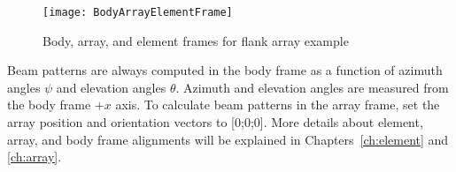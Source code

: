 \begin{figure}[!ht]
\begin{center}
\texttt{[image: BodyArrayElementFrame]}
\caption{\label{fig:ReferenceFrames}Body, array, and element frames for flank array example}
\end{center}
\end{figure}

Beam patterns are always computed in the body frame as a function of azimuth angles $\psi$ and elevation angles $\theta$. Azimuth and elevation angles are measured from the body frame $+x$ axis. To calculate beam patterns in the array frame, set the array position and orientation vectors to [0;0;0]. More details about element, array, and body frame alignments will be explained in Chapters~\ref{ch:element} and \ref{ch:array}.
